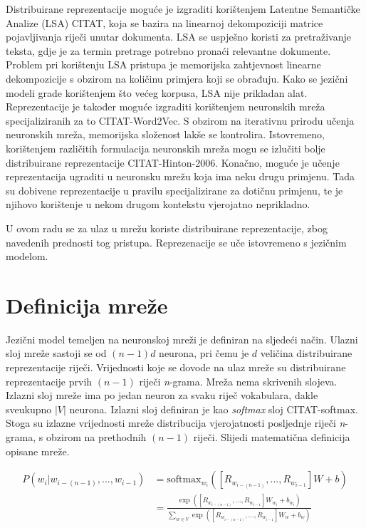 \documentclass[times, utf8, diplomski, numeric]{fer}
\begin{document}
Distribuirane reprezentacije moguće je izgraditi korištenjem Latentne Semantičke Analize (LSA) CITAT, koja se bazira na linearnoj dekompoziciji matrice pojavljivanja riječi unutar dokumenta. LSA se uspješno koristi za pretraživanje teksta, gdje je za termin pretrage potrebno pronaći relevantne dokumente. Problem pri korištenju LSA pristupa je memorijska zahtjevnost linearne dekompozicije s obzirom na količinu primjera koji se obrađuju. Kako se jezični modeli grade korištenjem što većeg korpusa, LSA nije prikladan alat. Reprezentacije je također moguće izgraditi korištenjem neuronskih mreža specijaliziranih za to CITAT-Word2Vec. S obzirom na iterativnu prirodu učenja neuronskih mreža, memorijska složenost lakše se kontrolira. Istovremeno, korištenjem različitih formulacija neuronskih mreža mogu se izlučiti bolje distribuirane reprezentacije CITAT-Hinton-2006. Konačno, moguće je učenje reprezentacija ugraditi u neuronsku mrežu koja ima neku drugu primjenu. Tada su dobivene reprezentacije u pravilu specijalizirane za dotičnu primjenu, te je njihovo korištenje u nekom drugom kontekstu vjerojatno neprikladno.

U ovom radu se za ulaz u mrežu koriste distribuirane reprezentacije, zbog navedenih prednosti tog pristupa. Reprezenacije se uče istovremeno s jezičnim modelom.

\section{Definicija mreže}

Jezični model temeljen na neuronskoj mreži je definiran na sljedeći način. Ulazni sloj mreže sastoji se od $(n - 1) d$ neurona, pri čemu je $d$ veličina distribuirane reprezentacije riječi. Vrijednosti koje se dovode na ulaz mreže su distribuirane reprezentacije prvih $(n - 1)$ riječi \textit{n}-grama. Mreža nema skrivenih slojeva. Izlazni sloj mreže ima po jedan neuron za svaku riječ vokabulara, dakle sveukupno $|V|$ neurona. Izlazni sloj definiran je kao \textit{softmax} sloj CITAT-softmax. Stoga su izlazne vrijednosti mreže distribucija vjerojatnosti posljednje riječi \textit{n}-grama, s obzirom na prethodnih $(n - 1)$ riječi. Slijedi matematična definicija opisane mreže.

\begin{equation}
\label{eq:lnnet}
\begin{split}
P(w_i | w_{i - (n - 1)}, ... , w_{i - 1}) 
  & = \text{softmax}_{w_i}\left(\left[R_{w_{i - (n - 1)}}, ..., R_{w_{i - 1}}\right] W + b\right) \\[1ex]
  & = \frac{\exp\left(\left[R_{w_{i - (n - 1)}}, ... , R_{w_{i - 1}}\right] W_{w_i} + b_{w_i}\right)}
           {\sum_{w \in V} \exp\left(\left[R_{w_{i - (n - 1)}}, ... , R_{w_{i - 1}}\right] W_{w} + b_{w}\right)}
\end{split}
\end{equation}
\end{document}
